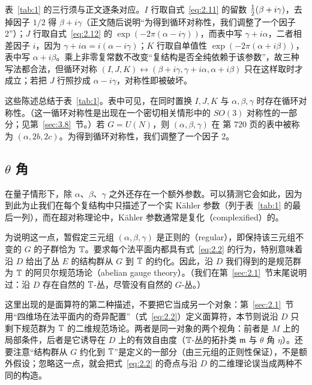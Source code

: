 \begin{yizhu}[易错点]
表~\ref{tab:1} 的三行须与正文逐条对应。$I$ 行取自式~\eqref{eq:2.11} 的留数 ${1\over2}(\beta+i\gamma)$，去掉因子 $1/2$ 得 $\beta+i\gamma$（正文随后说明“为得到循环对称性，我们调整了一个因子 2”）；$J$ 行取自式~\eqref{eq:2.12} 的 $\exp(-2\pi(\alpha-i\gamma))$，而表中写 $\gamma+i\alpha$，二者相差因子 $i$，因为 $\gamma+i\alpha=i(\alpha-i\gamma)$；$K$ 行取自单值性 $\exp(-2\pi(\alpha+i\beta))$，表中写 $\alpha+i\beta$。乘上非零复常数不改变“复结构是否全纯依赖于该参数”，故三种写法都合法，但循环对称 $(I,J,K)\leftrightarrow(\beta+i\gamma,\gamma+i\alpha,\alpha+i\beta)$ 只在这样取时才成立；若把 $J$ 行照抄成 $\alpha-i\gamma$，对称性即被破坏。
\end{yizhu}


这些陈述总结于表~\ref{tab:1}。表中可见，在同时置换 $I,J,K$ 与 $\alpha,\beta,\gamma$ 时存在循环对称性。（这一循环对称性是出现在一个密切相关情形中的 $SO(3)$ 对称性的一部分；见第~\ref{sec:3.8}~节。）若 $G=U(N)$，则 $(\alpha,\beta,\gamma)$ 在 \cite{ref22} 第 720 页的表中被称为 $(\alpha,2b,2c)$。为得到循环对称性，我们调整了一个因子 2。


\subsection{\texorpdfstring{$\theta$ 角}{θ 角}}

\label{sec:2.3}

在量子情形下，除 $\alpha$、$\beta$、$\gamma$ 之外还存在一个额外参数。可以猜测它会如此，因为到此为止我们在每个复结构中只描述了一个实 Kähler 参数（列于表~\ref{tab:1} 的最后一列），而在超对称理论中，Kähler 参数通常是复化（complexified）的。

为说明这一点，暂假定三元组 $(\alpha, \beta,\gamma)$ 是正则的（regular），即保持该三元组不变的 $G$ 的子群恰为 ${\mathbb{T}}$。要求每个法平面内都具有式~\eqref{eq:2.2} 的行为，特别意味着沿 $D$ 给出了丛 $E$ 的结构群从 $G$ 到 ${\mathbb{T}}$ 的约化。因此，沿 $D$ 我们得到的是规范群为 ${\mathbb{T}}$ 的阿贝尔规范场论（abelian gauge theory）。（我们在第~\ref{sec:2.1}~节末尾说明过：沿 $D$ 存在自然的 ${\mathbb{T}}$-丛，尽管没有自然的 $G$-丛。）

\begin{yizhu}[易错点]
这里出现的是面算符的第二种描述，不要把它当成另一个对象：第~\ref{sec:2.1}~节用“四维场在法平面内的奇异配置”（式~\eqref{eq:2.2}）定义面算符，本节则说沿 $D$ 只剩下规范群为 ${\mathbb{T}}$ 的二维规范场论。两者是同一对象的两个视角：前者是 $M$ 上的局部条件，后者是它诱导在 $D$ 上的有效自由度（${\mathbb{T}}$-丛的拓扑类 $\mathfrak m$ 与 $\theta$ 角 $\eta$）。还要注意“结构群从 $G$ 约化到 ${\mathbb{T}}$”是定义的一部分（由三元组的正则性保证），不是额外假设；忽略这一点，就会把式~\eqref{eq:2.2} 的奇点与沿 $D$ 的二维理论误当成两种不同的构造。
\end{yizhu}

